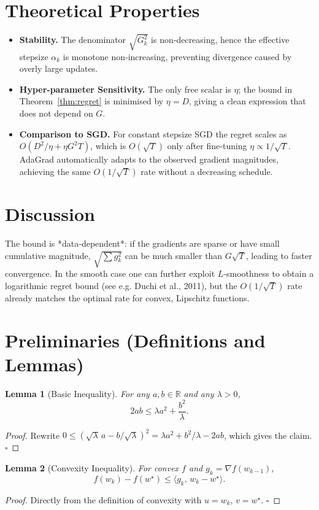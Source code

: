 \documentclass{article}
\newtheorem{lemma}{Lemma}
\begin{document}
\section*{Theoretical Properties}
\begin{itemize}
\item \textbf{Stability.} The denominator $\sqrt{G_{k}^{2}}$ is non‑decreasing,
hence the effective stepsize $\alpha_{k}$ is monotone non‑increasing,
preventing divergence caused by overly large updates.
\item \textbf{Hyper‑parameter Sensitivity.}
The only free scalar is $\eta$; the bound in Theorem~\ref{thm:regret}
is minimised by $\eta=D$, giving a clean expression that does not depend on $G$.
\item \textbf{Comparison to SGD.}
For constant stepsize SGD the regret scales as $O(D^{2}/\eta+ \eta G^{2}T)$,
which is $O(\sqrt{T})$ only after fine‑tuning $\eta\propto 1/\sqrt{T}$.
AdaGrad automatically adapts to the observed gradient magnitudes,
achieving the same $O(1/\sqrt{T})$ rate without a decreasing schedule.
\end{itemize}

\section*{Discussion}
The bound is *data‑dependent*: if the gradients are sparse or
have small cumulative magnitude, $ \sqrt{\sum g_{k}^{2}} $ can be much smaller
than $G\sqrt{T}$, leading to faster convergence.
In the smooth case one can further exploit $L$‑smoothness to obtain a
logarithmic regret bound (see e.g. Duchi et al., 2011), but the $O(1/\sqrt{T})$
rate already matches the optimal rate for convex, Lipschitz functions.

\newpage
\section*{Preliminaries (Definitions and Lemmas)}
\begin{lemma}[Basic Inequality]\label{lem:basic}
For any $a,b\in\mathbb{R}$ and any $\lambda>0$,
\[
2ab\le \lambda a^{2}+ \frac{b^{2}}{\lambda}.
\]
\end{lemma}
\begin{proof}
Rewrite $0\le (\sqrt{\lambda}\,a - b/\sqrt{\lambda})^{2}= \lambda a^{2}+b^{2}/\lambda-2ab$,
which gives the claim. $\square$
\end{proof}

\begin{lemma}[Convexity Inequality]\label{lem:conv}
For convex $f$ and $g_{k}=\nabla f(w_{k-1})$,
\[
f(w_{k})-f(w^{\star})\le\langle g_{k},\,w_{k}-w^{\star}\rangle.
\]
\end{lemma}
\begin{proof}
Directly from the definition of convexity with $u=w_{k}$, $v=w^{\star}$. $\square$
\end{proof}
\end{document}
